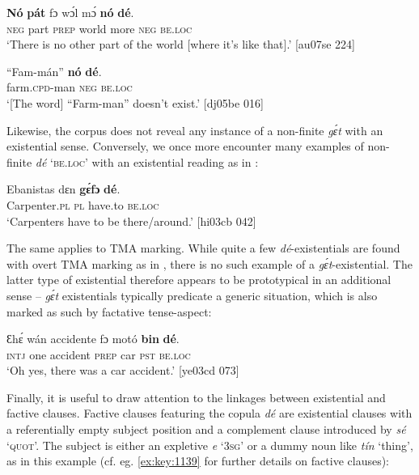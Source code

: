 \ea%
    \label{ex:key:812}
    \gll \textbf{Nó}  \textbf{pát}  fɔ  wɔ́l    mɔ́    \textbf{nó}  \textbf{dé}.\\
\textsc{neg}  part  \textsc{prep}  world  more  \textsc{neg}  \textsc{be.loc}\\

\glt ‘There is no other part of the world [where it’s like that].’ [au07se 224]
\z


\ea%
    \label{ex:key:813}
    \gll “Fam-mán”  \textbf{nó}  \textbf{dé}.\\
\phantom{“}farm.\textsc{cpd}{}-man  \textsc{neg}  \textsc{be.loc}\\

\glt ‘[The word] “Farm-man” doesn’t exist.’ [dj05be 016]
\z

Likewise, the corpus does not reveal any instance of a non-finite \textit{gɛ́t} with an existential sense. Conversely, we once more encounter many examples of non-finite \textit{dé} ‘\textsc{be.loc}’ with an existential reading as in :


\ea%
    \label{ex:key:814}
    \gll Ebanistas  dɛn  \textbf{gɛ́fɔ}    \textbf{dé}.\\
Carpenter.\textsc{pl}  \textsc{pl}  have.to  \textsc{be.loc}\\

\glt ‘Carpenters have to be there/around.’ [hi03cb 042]
\z

The same applies to TMA marking. While quite a few \textit{dé}-existentials are found with overt TMA marking as in , there is no such example of a \textit{gɛ́t}-existential. The latter type of existential therefore appears to be prototypical in an additional sense – \textit{gɛ́t} existentials typically predicate a generic situation, which is also marked as such by factative{\fff} tense-aspect:


\ea%
    \label{ex:key:815}
    \gll Ɛhɛ́  wán  accidente  fɔ  motó  \textbf{bin}  \textbf{dé}.\\
\textsc{intj}  one  accident    \textsc{prep}  car    \textsc{pst}  \textsc{be.loc}\\

\glt ‘Oh yes, there was a car accident.’ [ye03cd 073]
\z

Finally, it is useful to draw attention to the linkages between existential and factive clauses. Factive clauses featuring the copula \textit{dé} are existential clauses with a referentially empty subject position and a complement clause introduced by \textit{sé} ‘\textsc{quot}’. The subject is either an expletive \textit{e} ‘\textsc{3sg}’ or a dummy noun like \textit{tín} ‘thing’, as in this example (cf. eg. \ref{ex:key:1139} for further details on factive clauses): 


